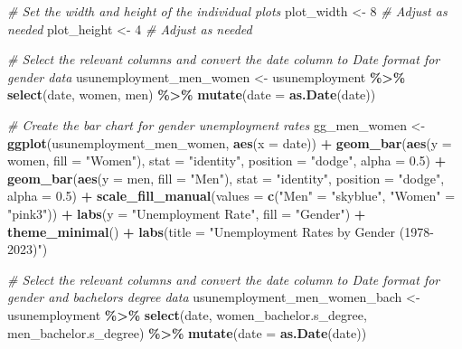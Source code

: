\documentclass[
]{article}
\newenvironment{Shaded}{\begin{snugshade}}{\end{snugshade}}
\newcommand{\AttributeTok}[1]{\textcolor[rgb]{0.13,0.29,0.53}{#1}}
\newcommand{\CommentTok}[1]{\textcolor[rgb]{0.56,0.35,0.01}{\textit{#1}}}
\newcommand{\DecValTok}[1]{\textcolor[rgb]{0.00,0.00,0.81}{#1}}
\newcommand{\FloatTok}[1]{\textcolor[rgb]{0.00,0.00,0.81}{#1}}
\newcommand{\FunctionTok}[1]{\textcolor[rgb]{0.13,0.29,0.53}{\textbf{#1}}}
\newcommand{\NormalTok}[1]{#1}
\newcommand{\OtherTok}[1]{\textcolor[rgb]{0.56,0.35,0.01}{#1}}
\newcommand{\SpecialCharTok}[1]{\textcolor[rgb]{0.81,0.36,0.00}{\textbf{#1}}}
\newcommand{\StringTok}[1]{\textcolor[rgb]{0.31,0.60,0.02}{#1}}
\begin{document}
\begin{Shaded}
\begin{Highlighting}[]
\CommentTok{\# Set the width and height of the individual plots}
\NormalTok{plot\_width }\OtherTok{\textless{}{-}} \DecValTok{8}  \CommentTok{\# Adjust as needed}
\NormalTok{plot\_height }\OtherTok{\textless{}{-}} \DecValTok{4}  \CommentTok{\# Adjust as needed}

\CommentTok{\# Select the relevant columns and convert the date column to Date format for gender data}
\NormalTok{usunemployment\_men\_women }\OtherTok{\textless{}{-}}\NormalTok{ usunemployment }\SpecialCharTok{\%\textgreater{}\%}
  \FunctionTok{select}\NormalTok{(date, women, men) }\SpecialCharTok{\%\textgreater{}\%}
  \FunctionTok{mutate}\NormalTok{(}\AttributeTok{date =} \FunctionTok{as.Date}\NormalTok{(date))}

\CommentTok{\# Create the bar chart for gender unemployment rates}
\NormalTok{gg\_men\_women }\OtherTok{\textless{}{-}} \FunctionTok{ggplot}\NormalTok{(usunemployment\_men\_women, }\FunctionTok{aes}\NormalTok{(}\AttributeTok{x =}\NormalTok{ date)) }\SpecialCharTok{+}
  \FunctionTok{geom\_bar}\NormalTok{(}\FunctionTok{aes}\NormalTok{(}\AttributeTok{y =}\NormalTok{ women, }\AttributeTok{fill =} \StringTok{"Women"}\NormalTok{), }\AttributeTok{stat =} \StringTok{"identity"}\NormalTok{, }\AttributeTok{position =} \StringTok{"dodge"}\NormalTok{, }\AttributeTok{alpha =} \FloatTok{0.5}\NormalTok{) }\SpecialCharTok{+}
  \FunctionTok{geom\_bar}\NormalTok{(}\FunctionTok{aes}\NormalTok{(}\AttributeTok{y =}\NormalTok{ men, }\AttributeTok{fill =} \StringTok{"Men"}\NormalTok{), }\AttributeTok{stat =} \StringTok{"identity"}\NormalTok{, }\AttributeTok{position =} \StringTok{"dodge"}\NormalTok{, }\AttributeTok{alpha =} \FloatTok{0.5}\NormalTok{) }\SpecialCharTok{+}
  \FunctionTok{scale\_fill\_manual}\NormalTok{(}\AttributeTok{values =} \FunctionTok{c}\NormalTok{(}\StringTok{"Men"} \OtherTok{=} \StringTok{"skyblue"}\NormalTok{, }\StringTok{"Women"} \OtherTok{=} \StringTok{"pink3"}\NormalTok{)) }\SpecialCharTok{+}
  \FunctionTok{labs}\NormalTok{(}\AttributeTok{y =} \StringTok{"Unemployment Rate"}\NormalTok{, }\AttributeTok{fill =} \StringTok{"Gender"}\NormalTok{) }\SpecialCharTok{+}
  \FunctionTok{theme\_minimal}\NormalTok{() }\SpecialCharTok{+}
  \FunctionTok{labs}\NormalTok{(}\AttributeTok{title =} \StringTok{"Unemployment Rates by Gender (1978{-}2023)"}\NormalTok{)}

\CommentTok{\# Select the relevant columns and convert the date column to Date format for gender and bachelor\textquotesingle{}s degree data}
\NormalTok{usunemployment\_men\_women\_bach }\OtherTok{\textless{}{-}}\NormalTok{ usunemployment }\SpecialCharTok{\%\textgreater{}\%}
  \FunctionTok{select}\NormalTok{(date, women\_bachelor.s\_degree, men\_bachelor.s\_degree) }\SpecialCharTok{\%\textgreater{}\%}
  \FunctionTok{mutate}\NormalTok{(}\AttributeTok{date =} \FunctionTok{as.Date}\NormalTok{(date))}


\end{Highlighting}
\end{Shaded}
\end{document}

